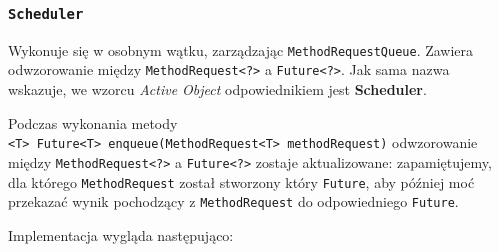 \documentclass[11pt]{article}
\begin{document}
    \hypertarget{scheduler}{%
\subsubsection{\texorpdfstring{\texttt{Scheduler}}{Scheduler}}\label{scheduler}}

Wykonuje się w osobnym wątku, zarządzając \texttt{MethodRequestQueue}.
Zawiera odwzorowanie między
\texttt{MethodRequest\textless{}?\textgreater{}} a
\texttt{Future\textless{}?\textgreater{}}. Jak sama nazwa wskazuje, we
wzorcu \emph{Active Object} odpowiednikiem jest \textbf{Scheduler}.

Podczas wykonania metody
\texttt{\textless{}T\textgreater{}\ Future\textless{}T\textgreater{}\ enqueue(MethodRequest\textless{}T\textgreater{}\ methodRequest)}
odwzorowanie między \texttt{MethodRequest\textless{}?\textgreater{}} a
\texttt{Future\textless{}?\textgreater{}} zostaje aktualizowane:
zapamiętujemy, dla którego \texttt{MethodRequest} został stworzony który
\texttt{Future}, aby później moć przekazać wynik pochodzący z
\texttt{MethodRequest} do odpowiedniego \texttt{Future}.

Implementacja wygląda następująco:
\end{document}
